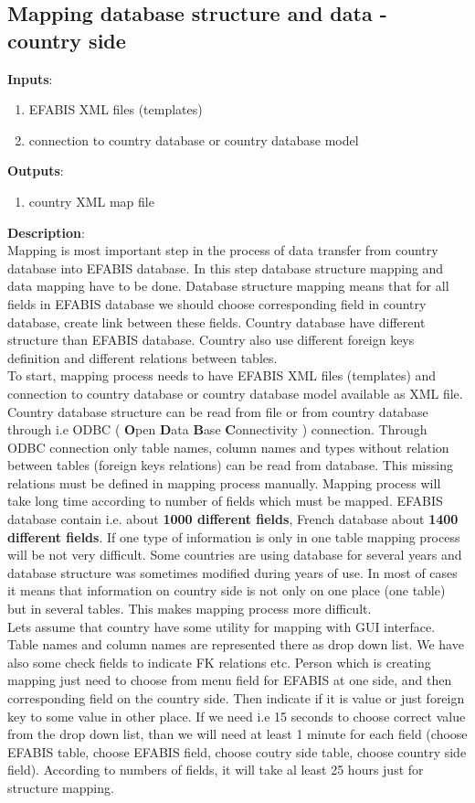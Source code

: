 \subsection{Mapping database structure and data - country side}
\label{sub:mapping}
\textbf{Inputs}:
\begin{enumerate}
\item EFABIS XML files (templates)
\item connection to country database or country database model
\end{enumerate}
\textbf{Outputs}:
\begin{enumerate}
\item country XML map file
\end{enumerate}
\textbf{Description}:\\
Mapping is most important step in the process of data transfer from country database into EFABIS database.
In this step  database structure mapping and data mapping have to be done. Database structure mapping means that for all fields in EFABIS database we should choose corresponding field in country database, create link between these fields. Country database have different structure than EFABIS database. Country also use different foreign keys definition and different relations between tables. \\
To start, mapping process needs to have EFABIS XML files (templates) and connection to country database or country database model available as XML file. Country database structure can be read from file or from country database through i.e ODBC ( \textbf{O}pen  \textbf{D}ata \textbf{B}ase \textbf{C}onnectivity ) connection. Through ODBC connection only table names, column names and types without relation between tables (foreign keys relations) can be read from database. This missing relations must be defined in mapping process manually. Mapping process will take long time according to number of fields which must be mapped. EFABIS database contain i.e. about  \textbf{1000 different fields}, French database about \textbf{1400 different fields}. If one type of information is only in one table mapping process will be not very difficult. Some countries are using database for several years and database structure was sometimes modified during years of use. In most of cases it means that information on country side is not only on one place (one table) but in several tables. This makes mapping process more difficult.\\
Lets assume that country have some utility for mapping with GUI interface. Table names and column names are represented there as drop down list. We have also some check fields to indicate FK relations etc. Person which is creating mapping just need to choose from menu field for EFABIS at one side, and then corresponding field on the country side. Then indicate if it is value or just foreign key to some value in other place.  If we need i.e 15 seconds to choose correct value from the drop down list, than we will need at least 1 minute for each field (choose EFABIS table, choose EFABIS field, choose coutry side table, choose country side field). According to numbers of fields, it will take al least 25 hours just for structure mapping.\\
